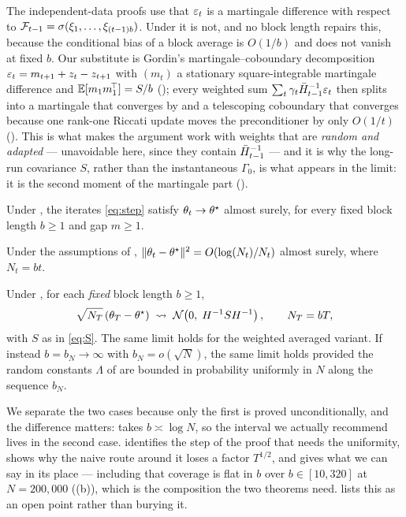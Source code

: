 The independent-data proofs use that $\varepsilon_t$ is a martingale difference with respect to
$\mathcal{F}_{t-1}=\sigma(\xi_1,\dots,\xi_{(t-1)b})$. Under  it is not, and no block length repairs
this, because the conditional bias of a block average is $O(1/b)$ and does not vanish at fixed $b$. Our
substitute is Gordin's martingale--coboundary decomposition
$\varepsilon_t=m_{t+1}+z_t-z_{t+1}$ with $(m_t)$ a stationary square-integrable martingale difference and
$\mathbb{E}[m_1m_1^{\!\top}]=S/b$ (); every weighted sum $\sum_t\gamma_t\bar{H}_{t-1}^{-1}\varepsilon_t$
then splits into a martingale that converges by  and a telescoping coboundary that
converges because one rank-one Riccati update moves the preconditioner by only $O(1/t)$
(). This is what makes the argument work with weights that are \emph{random and adapted}
--- unavoidable here, since they contain $\bar{H}_{t-1}^{-1}$ --- and it is why the long-run covariance $S$,
rather than the instantaneous $\Gamma_0$, is what appears in the limit: it is the second moment of the
martingale part ().

\begin{theorem}
\label{thm:as}
Under , the iterates \eqref{eq:step} satisfy
$\theta_t\to\theta^\star$ almost surely, for every fixed block length $b\ge1$ and gap $m\ge1$.
\end{theorem}

\begin{theorem}[Rate]
\label{thm:rate}
Under the assumptions of , $\lVert \theta_t-\theta^\star \rVert^2=O(\log(N_t)/N_t)$ almost
surely, where $N_t=bt$.
\end{theorem}

\begin{theorem}
\label{thm:clt}
Under , for each \emph{fixed} block length $b\ge1$,
\[
\sqrt{N_T}\,(\theta_T-\theta^\star)\;\rightsquigarrow\;\mathcal{N}\!\left(0,\;H^{-1}SH^{-1}\right),
\qquad N_T=bT,
\]
with $S$ as in \eqref{eq:S}. The same limit holds for the weighted averaged variant. If instead
$b=b_N\to\infty$ with $b_N=o(\sqrt N)$, the same limit holds provided the random constants
$\Lambda$ of  are bounded in probability uniformly in $N$ along the
sequence $b_N$.
\end{theorem}

\noindent
We separate the two cases because only the first is proved unconditionally, and the difference
matters:  takes $b\asymp\log N$, so the interval we actually recommend lives in the
second case.  identifies the step of the proof that needs the uniformity, shows
why the naive route around it loses a factor $T^{1/2}$, and gives what we can say in its place ---
including that coverage is flat in $b$ over $b\in[10,320]$ at $N=200{,}000$
((b)), which is the composition the two theorems need.  lists
this as an open point rather than burying it.




